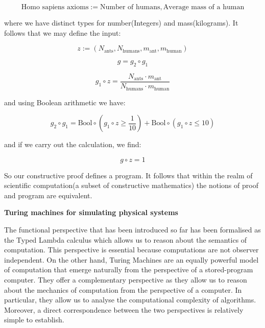\documentclass{article}
\begin{document}
\begin{equation}
\textrm{Homo sapiens axioms} := \textrm{Number of humans}, \textrm{Average mass of a human}
\end{equation}

where we have distinct types for number(Integers) and mass(kilograms). It follows that we may define the input:

\begin{equation}
z := (N_{\textrm{ants}}, N_{\textrm{humans}}, m_{\textrm{ant}}, m_{\textrm{human}})
\end{equation}

\begin{equation}
g = g_2 \circ g_1
\end{equation}

\begin{equation}
g_1 \circ z = \frac{N_{\textrm{ants}} \cdot m_{\textrm{ant}}}{N_{\textrm{humans}} \cdot m_{\textrm{human}}}
\end{equation}

and using Boolean arithmetic we have:

\begin{equation}
g_2 \circ g_1 = \textrm{Bool} \circ (g_1 \circ z \geq \frac{1}{10}) + \textrm{Bool} \circ (g_1 \circ z \leq 10)
\end{equation}

and if we carry out the calculation, we find:

\begin{equation}
g \circ z = 1
\end{equation}

So our constructive proof defines a program. It follows that within the realm of scientific computation(a subset of
constructive mathematics) the notions of proof and program are equivalent.

\newpage 

\textbf{Turing machines for simulating physical systems}

The functional perspective that has been introduced so far has been formalised as the Typed Lambda calculus which
allows us to reason about the semantics of computation. This perspective is essential because computations are not observer
independent. On the other hand, Turing Machines are an equally powerful model of computation that emerge naturally from
the perspective of a stored-program computer. They offer a complementary perspective as they allow us to reason about the
mechanics of computation from the perspective of a computer. In particular, they allow us to analyse the computational complexity of algorithms. Moreover, a direct correspondence between the two perspectives is relatively simple to establish.
\end{document}
